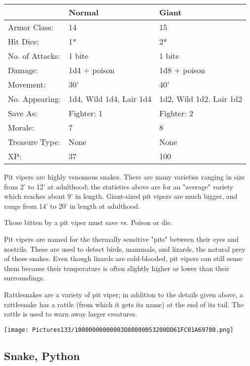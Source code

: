 \documentclass[a4paper,twoside,openany,10pt]{book}
\begin{document}
\begin{multicols}{2}
\begin{tabularx}{0.50\textwidth}{@{}XXX@{}}
& Normal & Giant \\\hline
Armor Class: & 14 & 15 \\\hline
Hit Dice: & 1* & 2* \\\hline
No. of Attacks: & 1 bite & 1 bite \\\hline
Damage: & 1d4 + poison & 1d8 + poison \\\hline
Movement: & 30' & 40' \\\hline
No. Appearing: & 1d4, Wild 1d4, Lair 1d4 & 1d2, Wild 1d2, Lair 1d2 \\\hline
Save As: & Fighter: 1 & Fighter: 2 \\\hline
Morale: & 7 & 8 \\\hline
Treasure Type: & None & None \\\hline
XP: & 37 & 100 \\\hline
\end{tabularx}

Pit vipers are highly venomous snakes. There are many varieties ranging in size from 2' to 12' at adulthood; the statistics above are for an "average" variety which reaches about 9' in length. Giant-sized pit vipers are much bigger, and range from 14' to 20' in length at adulthood.

Those bitten by a pit viper must save vs. Poison or die.

Pit vipers are named for the thermally sensitive "pits" between their eyes and nostrils. These are used to detect birds, mammals, and lizards, the natural prey of these snakes. Even though lizards are cold-blooded, pit vipers can still sense them because their temperature is often slightly higher or lower than their surroundings.

Rattlesnakes are a variety of pit viper; in addition to the details given above, a rattlesnake has a rattle (from which it gets its name) at the end of its tail. The rattle is used to warn away larger creatures. 


\begin{center} \texttt{[image: Pictures133/10000000000003D80000053200DD61FC01A69780.png]} \end{center}


\subsection*{Snake, Python}\label{snake-python}


\end{multicols}
\end{document}
